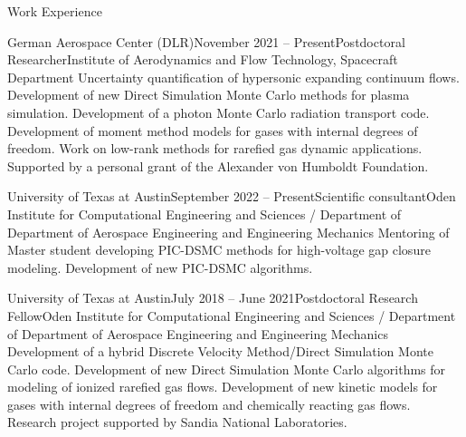 \documentclass{resume} %
\begin{document}

\begin{rSection}{Work Experience}

\begin{rSubsection}{German Aerospace Center (DLR)}{November 2021 -- Present}{Postdoctoral Researcher}{Institute of Aerodynamics and Flow Technology, Spacecraft Department}
Uncertainty quantification of hypersonic expanding continuum flows. Development of new Direct Simulation Monte Carlo methods for plasma simulation. Development of a photon Monte Carlo radiation transport code. Development of moment method models for gases with internal degrees of freedom. Work on low-rank methods for rarefied gas dynamic applications. Supported by a personal grant of the Alexander von Humboldt Foundation.
\end{rSubsection}

\begin{rSubsection}{University of Texas at Austin}{September 2022 -- Present}{Scientific consultant}{Oden Institute for Computational Engineering and Sciences / Department of Department of Aerospace Engineering and Engineering Mechanics}
Mentoring of Master student developing PIC-DSMC methods for high-voltage gap closure modeling. Development of new PIC-DSMC algorithms.
\end{rSubsection}

\begin{rSubsection}{University of Texas at Austin}{July 2018 -- June 2021}{Postdoctoral Research Fellow}{Oden Institute for Computational Engineering and Sciences / Department of Department of Aerospace Engineering and Engineering Mechanics}
Development of a hybrid Discrete Velocity Method/Direct Simulation Monte Carlo code. Development of new Direct Simulation Monte Carlo algorithms for modeling of ionized rarefied gas flows. Development of new kinetic models for gases with internal degrees of freedom and chemically reacting gas flows.
Research project supported by Sandia National Laboratories.
\end{rSubsection}




\end{rSection}
\end{document}
